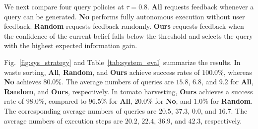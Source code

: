 

We next compare four query policies at $\tau=0.8$. \textbf{All} requests feedback whenever a query can be generated. \textbf{No} performs fully autonomous execution without user feedback. \textbf{Random} requests feedback randomly. \textbf{Ours} requests feedback when the confidence of the current belief falls below the threshold and selects the query with the highest expected information gain.


Fig.~\ref{fig:sys_strategy} and Table~\ref{tab:system_eval} summarize the results. In waste sorting, \textbf{All}, \textbf{Random}, and \textbf{Ours} achieve success rates of $100.0\%$, whereas \textbf{No} achieves $80.0\%$. The average numbers of queries are $15.8$, $6.8$, and $9.2$ for \textbf{All}, \textbf{Random}, and \textbf{Ours}, respectively. In tomato harvesting, \textbf{Ours} achieves a success rate of $98.0\%$, compared to $96.5\%$ for \textbf{All}, $20.0\%$ for \textbf{No}, and $1.0\%$ for \textbf{Random}. The corresponding average numbers of queries are $20.5$, $37.3$, $0.0$, and $16.7$. The average numbers of execution steps are $20.2$, $22.4$, $36.9$, and $42.3$, respectively.


